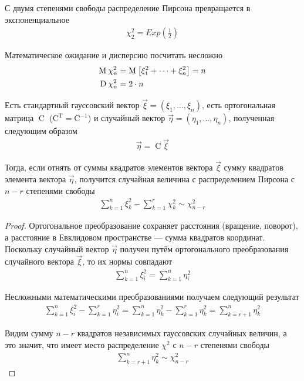 С двумя степенями свободы распределение Пирсона превращается в экспоненциальное
\begin{align*}
    \chi_2^2 = Exp\left( \frac{1}{2} \right)
\end{align*}

Математическое ожидание и дисперсию посчитать несложно
\begin{align*}
    \operatorname{M}_{} \chi_n^2 &= \operatorname{M}_{} \left[ \xi_1^2 + \dots + \xi_n^2 \right] = n \\
    \operatorname{D}_{} \chi_n^2 &= 2 \cdot n
\end{align*}

\begin{lemma}[Фишера]
    Есть стандартный гауссовский вектор
    $\vec{\xi} = \left( \xi_1, \dots, \xi_n \right)$, есть ортогональная матрица
    $\operatorname{C}$ ($\operatorname{C^T} = \operatorname{C^{-1}}$) и
    случайный вектор $\vec{\eta} = \left( \eta_1, \dots, \eta_n \right)$,
    полученная следующим образом
    \begin{align*}
        \vec{\eta} = \operatorname{C} \vec{\xi}
    \end{align*}

    Тогда, если отнять от суммы квадратов элементов вектора $\vec{\xi}$ сумму
    квадратов элемента вектора $\vec{\eta}$, получится случайная величина
    с распределением Пирсона с $n-r$ степенями свободы
    \begin{align*}
        \sum_{k=1}^{n} \xi_k^2 - \sum_{k=1}^{r} \chi_k^2 \sim \chi_{n-r}^2
    \end{align*}
\end{lemma}
\begin{proof}
    Ортогональное преобразование сохраняет расстояния (вращение, поворот), а
    расстояние в Евклидовом пространстве --- сумма квадратов координат.
    Поскольку случайный вектор $\vec{\eta}$ получен путём ортогонального
    преобразования случайного вектора $\vec{\xi}$, то их нормы совпадают
    \begin{align*}
        \sum_{k=1}^{n}\xi_i^2 = \sum_{k=1}^{n}\eta_i^2
    \end{align*}

    Несложными математическими преобразованиями получаем следующий результат
    \begin{align*}
        \sum_{k=1}^{n} \xi_i^2 - \sum_{k=1}^{r} \eta_i^2
        = \sum_{k=1}^{n} \eta_k^2 - \sum_{k=1}^{r} \eta_k^2
        = \sum_{k=r+1}^{n} \eta_k^2
    \end{align*}

    Видим сумму $n-r$ квадратов независимых гауссовских случайных величин,
    а это значит, что имеет место распределение $\chi^2$ с $n-r$ степенями
    свободы
    \begin{align*}
        \sum_{k=r+1}^{n} \eta_k^2 \sim \chi_{n-r}^2
    \end{align*}
\end{proof}

